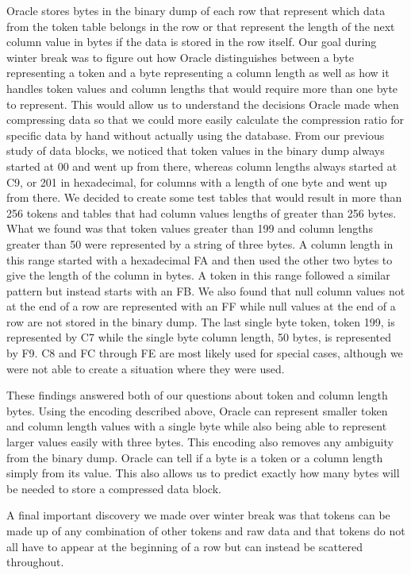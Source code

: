 \documentclass[10pt]{article}
\begin{document}
Oracle stores bytes in the binary dump of each row that represent which data from the token table belongs in the 
row or that represent the length of the next column value in bytes if the data is stored in the row itself. Our 
goal during winter break was to figure out how Oracle distinguishes between a byte representing a token and a 
byte representing a column length as well as how it handles token values and column lengths that would require 
more than one byte to represent. This would allow us to understand the decisions Oracle made when compressing 
data so that we could more easily calculate the compression ratio for specific data by hand without actually 
using the database. From our previous study of data blocks, we noticed that token values in the binary dump 
always started at 00 and went up from there, whereas column lengths always started at C9, or 201 in hexadecimal, 
for columns with a length of one byte and went up from there. We decided to create some test tables that 
would result in more than 256 tokens and tables that had column values lengths of greater than 256 bytes. What 
we found was that token values greater than 199 and column lengths greater than 50 were represented by a string 
of three bytes. A column length in this range started with a hexadecimal FA and then used the other two bytes to 
give the length of the column in bytes. A token in this range followed a similar pattern but instead starts 
with an FB. We also found that null column values not at the end of a row are represented with an FF while null 
values at the end of a row are not stored in the binary dump. The last single byte token, token 199, is 
represented by C7 while the single byte column length, 50 bytes, is represented by F9. C8 and FC through FE are 
most likely used for special cases, although we were not able to create a situation where they were used. 

These findings answered both of our questions about token and column length bytes. Using the encoding described 
above, Oracle can represent smaller token and column length values with a single byte while also being able to 
represent larger values easily with three bytes. This encoding also removes any ambiguity from the binary dump. 
Oracle can tell if a byte is a token or a column length simply from its value. This also allows us to predict 
exactly how many bytes will be needed to store a compressed data block.

A final important discovery we made over winter break was that tokens can be made up of any combination of other 
tokens and raw data and that tokens do not all have to appear at the beginning of a row but can instead be 
scattered throughout. 
\end{document}
